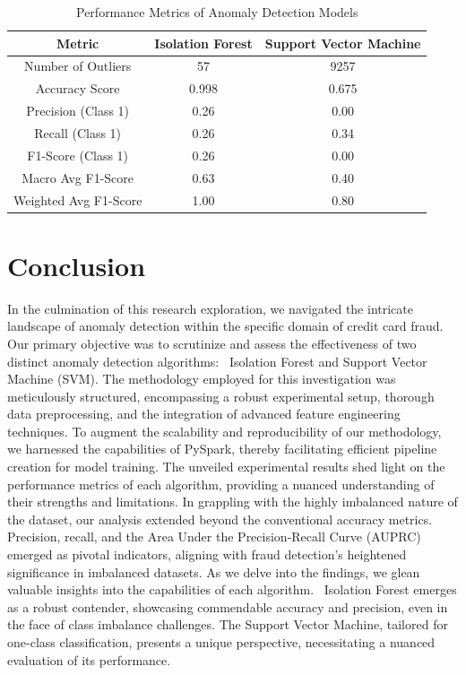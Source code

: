 \documentclass[journal]{IEEEtran}
\begin{document}
\begin{table}[htbp]
  \centering
  \caption{Performance Metrics of Anomaly Detection Models}
  \label{tab:performance_metrics}
  \begin{tabular}{|c|c|c|}
  \hline
    \textbf{Metric} & \textbf{Isolation Forest} & \textbf{Support Vector Machine} \\
    \hline
    Number of Outliers & 57 & 9257 \\
    \hline
    Accuracy Score & 0.998 & 0.675 \\
    \hline
    Precision (Class 1) & 0.26 & 0.00 \\
    \hline
    Recall (Class 1) & 0.26 & 0.34 \\
    \hline
    F1-Score (Class 1) & 0.26 & 0.00 \\
    \hline
    Macro Avg F1-Score & 0.63 & 0.40 \\
    \hline
    Weighted Avg F1-Score & 1.00 & 0.80 \\
    \hline
  \end{tabular}
  
\end{table}






\section{Conclusion}
In the culmination of this research exploration, we navigated the intricate landscape of anomaly detection within the specific domain of credit card fraud. Our primary objective was to scrutinize and assess the effectiveness of two distinct anomaly detection algorithms: ~Isolation Forest and Support Vector Machine (SVM). The methodology employed for this investigation was meticulously structured, encompassing a robust experimental setup, thorough data preprocessing, and the integration of advanced feature engineering techniques. To augment the scalability and reproducibility of our methodology, we harnessed the capabilities of PySpark, thereby facilitating efficient pipeline creation for model training. The unveiled experimental results shed light on the performance metrics of each algorithm, providing a nuanced understanding of their strengths and limitations. In grappling with the highly imbalanced nature of the dataset, our analysis extended beyond the conventional accuracy metrics. Precision, recall, and the Area Under the Precision-Recall Curve (AUPRC) emerged as pivotal indicators, aligning with fraud detection's heightened significance in imbalanced datasets. As we delve into the findings, we glean valuable insights into the capabilities of each algorithm. ~Isolation Forest emerges as a robust contender, showcasing commendable accuracy and precision, even in the face of class imbalance challenges. The Support Vector Machine, tailored for one-class classification, presents a unique perspective, necessitating a nuanced evaluation of its performance.
\end{document}
